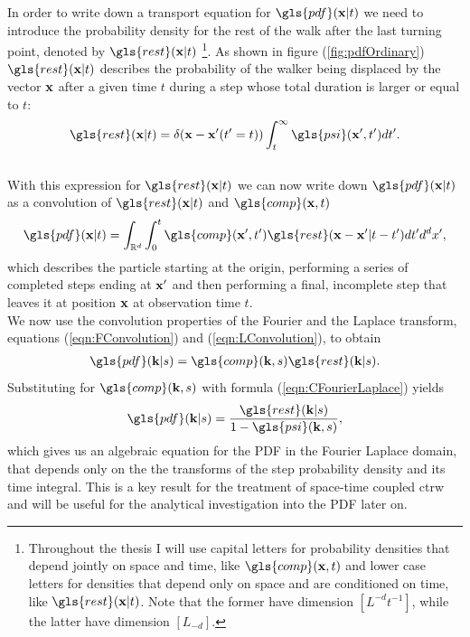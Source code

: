 In order to write down a transport equation for $\gls{pdf}(\ve{x}|t)$ we need to introduce the probability density for the rest of the walk after the last turning point, denoted by $\gls{rest}(\ve{x}|t)$
\footnote{
Throughout the thesis I will use capital letters for probability densities that depend jointly on space and time, like $\gls{comp}(\ve{x},t)$ and lower case letters for densities that depend only on space and are conditioned on time, like $\gls{rest}(\ve{x}|t)$. Note that the former have dimension $[L^{-d} t^{-1}]$, while the latter have dimension $[L_{-d}]$.
}. 
As shown in figure (\ref{fig:pdfOrdinary}) $\gls{rest}(\ve{x}|t)$ describes the probability of the walker being displaced by the vector $\mathbf{ x }$ after a given time $t$ during a step whose total duration is larger or equal to $t$:\\
%
{ \color{blue}
\begin{align}
\gls{rest}(\ve{x}|t) = \delta(\ve{x} - \ve{x}'(t'=t)) \int_{t}^{\infty} \gls{psi}(\ve{x}',t') dt' .
\end{align}
}
%
\\

With this expression for $\gls{rest}(\ve{x}|t)$ we can now write down $\gls{pdf}(\ve{x}|t)$ as a convolution of $\gls{rest}(\ve{x}|t)$ and $\gls{comp}(\ve{x},t)$
%
\begin{align}
\gls{pdf}(\ve{x}|t) = \int_{\mathbb{R}^{d}} \int_0^t  \gls{comp}(\ve{x}',t') \gls{rest}(\ve{x}-\ve{x}'|t-t') d t' d^{d}x' ,
\end{align}
%
which describes the particle starting at the origin, performing a series of completed steps ending at $\mathbf{ x' }$ and then performing a final, incomplete step that leaves it at position $\mathbf{ x }$ at observation time $t$.\\
We now use the convolution properties of the Fourier and the Laplace transform, equations (\ref{eqn:FConvolution}) and (\ref{eqn:LConvolution}), to obtain 
%
\begin{align}
\gls{pdf}(\ve{k}|s) = \gls{comp}(\ve{k},s) \gls{rest}(\ve{k}|s) \label{eqn:pdfFourierLaplaceI} .
\end{align}
%
Substituting for $\gls{comp}(\ve{k},s)$ with formula (\ref{eqn:CFourierLaplace}) yields
%
\begin{align}
\gls{pdf}(\ve{k}|s) = \frac{ \gls{rest}(\ve{k}|s)}{1 - \gls{psi}(\ve{k},s)} \label{eqn:pdfFourierLaplaceII} ,
\end{align}
%
which gives us an algebraic equation for the \gls{PDF} in the Fourier Laplace domain, that depends only on the the transforms of the step probability density and its time integral. This is a key result for the treatment of space-time coupled \gls{ctrw} {\color{blue} and will be useful for the analytical investigation into the \gls{PDF} later on.} \\

